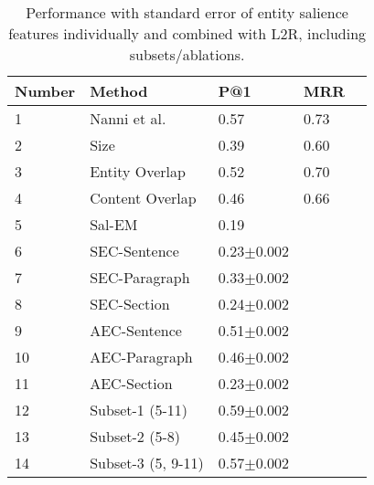 \documentclass[sigconf,authordraft]{acmart}
\begin{document}
\begin{table}[t]
    \caption{Performance with standard error of entity salience features individually and combined with L2R, including subsets/ablations.}
    \label{tab:Results-Entity Salience}
    \begin{tabular}{@{}lllll@{}}
        \toprule
        Number & 
        Method & 
        P@1 &
        MRR \\ 
        
        \midrule
        
     
      
      1 & 
      Nanni et al.&  
      0.57&
      0.73
      \\
      
     
      
      2 & 
      Size &
      0.39&
      0.60
      \\
     

    
      
       3 & 
      Entity Overlap &     
      0.52&
      0.70
      \\ 
      
      
      
    
      
      4 & 
      Content Overlap&     
      0.46&
      0.66
      \\ 
      
      \midrule
      
      5 & 
      Sal-EM   &   
      0.19&
      \\
       \midrule
      
      6 & 
      SEC-Sentence   &    
      0.23$\pm$0.002 &
      \\
      
      7 & 
      SEC-Paragraph  &    
      0.33$\pm$0.002 &
      \\
      
      8 & 
      SEC-Section  &    
      0.24$\pm$0.002 &
      \\
       \midrule
      
      9 & 
      AEC-Sentence   &    
      0.51$\pm$0.002 &
      \\
      
      10 & 
      AEC-Paragraph  &    
      0.46$\pm$0.002 &
      \\
      
      11 & 
      AEC-Section  &     
      0.23$\pm$0.002 &
      \\
    
       \midrule
       
      12 & 
      Subset-1 (5-11)&     
      0.59$\pm$0.002 &
      \\
      
      13 & 
      Subset-2 (5-8)&    
      0.45$\pm$0.002 &
      \\
      
      14 & 
      Subset-3 (5, 9-11)&     
      0.57$\pm$0.002 &
      \\
      
       \bottomrule
    \end{tabular}
\end{table}
\end{document}
